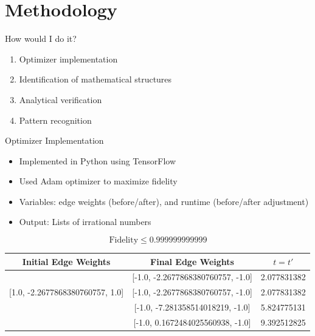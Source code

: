 \documentclass{beamer}
\begin{document}
\section{Methodology}
\begin{frame}{How would I do it?}
    \begin{enumerate}
        \item Optimizer implementation
        \item Identification of mathematical structures
        \item Analytical verification
        \item Pattern recognition
    \end{enumerate}
\end{frame}
\begin{frame}{Optimizer Implementation}
    \begin{itemize}
        \item Implemented in Python using TensorFlow
        \item Used Adam optimizer to maximize fidelity
        \item Variables: edge weights (before/after), and runtime (before/after adjustment)
        \item Output: Lists of irrational numbers
    \end{itemize}
    \begin{center}
        \begin{displaymath}
            \text{Fidelity}\leq0.999999999999
        \end{displaymath}
        \begin{tabular}{||c c c||}
            \hline
            Initial Edge Weights&Final Edge Weights&$t=t'$\\
            \hline
            [1.0, -2.2677868380760757, 1.0]&[-1.0, -2.2677868380760757, -1.0]&2.077831382\\
    
            [1.0, -2.2677868380760757, 1.0]&[-1.0, -2.2677868380760757, -1.0]&2.077831382\\
            \hline
            [1.0, -7.281358514018219, 1.0]&[-1.0, -7.281358514018219, -1.0]&5.824775131\\
            \hline
            [1.0, 0.1672484025560938, 1.0]&[-1.0, 0.1672484025560938, -1.0]&9.392512825\\
            \hline
        \end{tabular}
    \end{center}
\end{frame}
\end{document}
